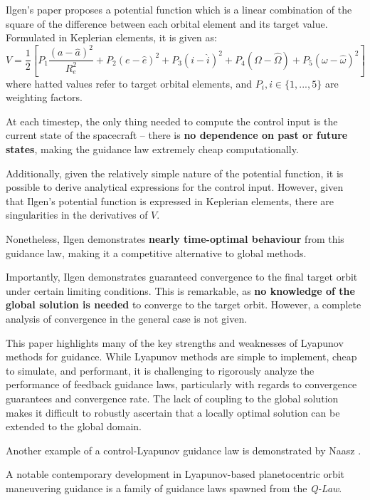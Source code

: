 Ilgen's paper proposes a potential function which is a linear combination of the square of the difference between each orbital element and its target value. Formulated in Keplerian elements, it is given as:
\begin{equation}
    V = \frac{1}{2} \left[P_1 \frac{(a - \hat{a})^2}{R_e^2} + P_2 (e - \hat{e})^2 + P_3 (i - \hat{i})^2 + P_4 (\Omega - \hat{\Omega}) + P_5 (\omega - \hat{\omega})^2  \right]
    \label{eq:ilgen_potential}
\end{equation}
where hatted values refer to target orbital elements, and $P_i, i \in \{1, ..., 5\}$ are weighting factors.

At each timestep, the only thing needed to compute the control input is the current state of the spacecraft -- there is \textbf{no dependence on past or future states}, making the guidance law extremely cheap computationally.

Additionally, given the relatively simple nature of the potential function, it is possible to derive analytical expressions for the control input. However, given that Ilgen's potential function is expressed in Keplerian elements, there are singularities in the derivatives of $V$.

Nonetheless, Ilgen demonstrates \textbf{nearly time-optimal behaviour} from this guidance law, making it a competitive alternative to global methods.

Importantly, Ilgen demonstrates guaranteed convergence to the final target orbit under certain limiting conditions. This is remarkable, as \textbf{no knowledge of the global solution is needed} to converge to the target orbit. However, a complete analysis of convergence in the general case is not given.

This paper highlights many of the key strengths and weaknesses of Lyapunov methods for guidance. While Lyapunov methods are simple to implement, cheap to simulate, and performant, it is challenging to rigorously analyze the performance of feedback guidance laws, particularly with regards to convergence guarantees and convergence rate. The lack of coupling to the global solution makes it difficult to robustly ascertain that a locally optimal solution can be extended to the global domain.

Another example of a control-Lyapunov guidance law is demonstrated by Naasz \cite{naasz2002classical}.

A notable contemporary development in Lyapunov-based planetocentric orbit maneuvering guidance is a family of guidance laws spawned from the \textit{Q-Law}.

